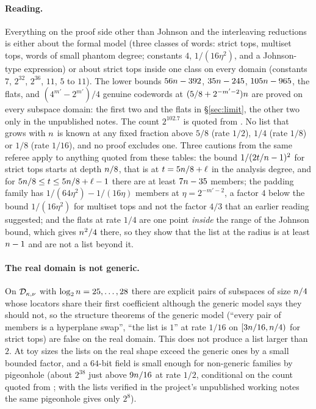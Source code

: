 \paragraph{Reading.} Everything on the proof side other than Johnson and the interleaving reductions is either about the formal model (three classes of words: strict tops, multiset tops, words of small phantom degree; constants $4$, $1/(16\eta^2)$, and a Johnson-type expression) or about strict tops inside one class on every domain (constants $7$, $2^{32}$, $2^{36}$, $11$, $5$ to $11$). The lower bounds $56n-392$, $35n-245$, $105n-965$, the flats, and $(4^{m'}-2^{m'})/4$ genuine codewords at $(5/8+2^{-m'-2})n$ are proved on every subspace domain: the first two and the flats in \S\ref{sec:limit}, the other two only in the unpublished notes. The count $2^{102.7}$ is quoted from \cite{DKTZ26}. No list that grows with $n$ is known at any fixed fraction above $5/8$ (rate $1/2$), $1/4$ (rate $1/8$) or $1/8$ (rate $1/16$), and no proof excludes one. Three cautions from the same referee apply to anything quoted from these tables: the bound $1/(2t/n-1)^2$ for strict tops starts at depth $n/8$, that is at $t=5n/8+\ell$ in the analysis degree, and for $5n/8\le t\le5n/8+\ell-1$ there are at least $7n-35$ members; the padding family has $1/(64\eta^2)-1/(16\eta)$ members at $\eta=2^{-m'-2}$, a factor $4$ below the bound $1/(16\eta^2)$ for multiset tops and not the factor $4/3$ that an earlier reading suggested; and the flats at rate $1/4$ are one point \emph{inside} the range of the Johnson bound, which gives $n^2/4$ there, so they show that the list at the radius is at least $n-1$ and are not a list beyond it.

\paragraph{The real domain is not generic.} On $\mathcal{D}_{\kappa,\nu}$ with $\log_2n=25,\dots,28$ there are explicit pairs of subspaces of size $n/4$ whose locators share their first coefficient although the generic model says they should not, so the structure theorems of the generic model (``every pair of members is a hyperplane swap'', ``the list is $1$'' at rate $1/16$ on $[3n/16,n/4)$ for strict tops) are false on the real domain. This does not produce a list larger than $2$. At toy sizes the lists on the real shape exceed the generic ones by a small bounded factor, and a $64$-bit field is small enough for non-generic families by pigeonhole (about $2^{38}$ just above $9n/16$ at rate $1/2$, conditional on the count quoted from \cite{DKTZ26}; with the lists verified in the project's unpublished working notes the same pigeonhole gives only $2^{8}$).

